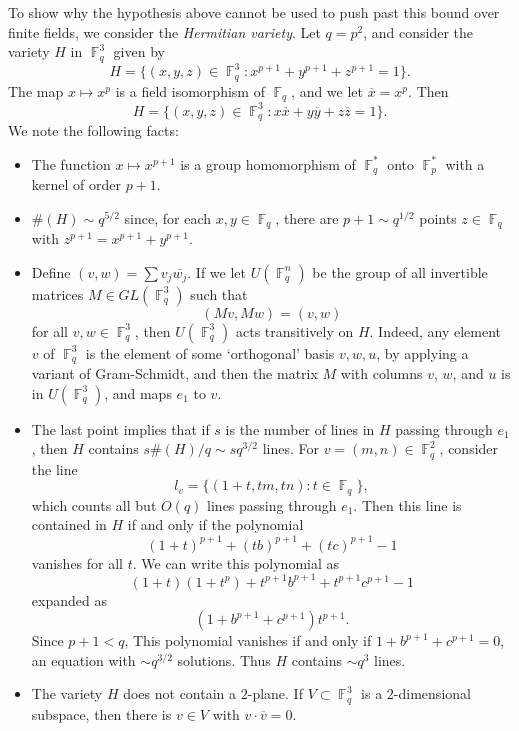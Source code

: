 \documentclass{article}
\DeclareMathOperator{\FF}{\mathbb{F}}
\theoremstyle{plain}
\theoremstyle{definition}
\begin{document}
To show why the hypothesis above cannot be used to push past this bound over finite fields, we consider the \emph{Hermitian variety}. Let $q = p^2$, and consider the variety $H$ in $\FF_q^3$ given by
%
\[ H = \{ (x,y,z) \in \FF_q^3: x^{p+1} + y^{p+1} + z^{p+1} = 1 \}. \]
%
The map $x \mapsto x^p$ is a field isomorphism of $\FF_q$, and we let $\overline{x} = x^p$. Then
%
\[ H = \{ (x,y,z) \in \FF_q^3: x \overline{x} + y \overline{y} + z \overline{z} = 1 \}. \]
%
We note the following facts:
%
\begin{itemize}
    \item The function $x \mapsto x^{p+1}$ is a group homomorphism of $\FF_q^*$ onto $\FF_p^*$ with a kernel of order $p + 1$.

    \item $\#(H) \sim q^{5/2}$ since, for each $x, y \in \FF_q$, there are $p + 1 \sim q^{1/2}$ points $z \in \FF_q$ with $z^{p+1} = x^{p+1} + y^{p+1}$.

    \item Define $(v,w) = \sum v_j \overline{w_j}$. If we let $U(\FF_q^n)$ be the group of all invertible matrices $M \in GL(\FF_q^3)$ such that
    \[ (Mv,Mw) = (v,w) \]
    for all $v,w \in \FF_q^3$, then $U(\FF_q^3)$ acts transitively on $H$. Indeed, any element $v$ of $\FF_q^3$ is the element of some `orthogonal' basis $v,w,u$, by applying a variant of Gram-Schmidt, and then the matrix $M$ with columns $v$, $w$, and $u$ is in $U(\FF_q^3)$, and maps $e_1$ to $v$.

    \item The last point implies that if $s$ is the number of lines in $H$ passing through $e_1$, then $H$ contains $s \#(H) / q \sim s q^{3/2}$ lines. For $v = (m,n) \in \FF_q^2$, consider the line
    \[ l_v = \{ ( 1 + t, tm, tn ) : t \in \FF_q \}, \]
    which counts all but $O(q)$ lines passing through $e_1$. Then this line is contained in $H$ if and only if the polynomial
    \[ (1 + t)^{p+1} + (tb)^{p+1} + (tc)^{p+1} - 1 \]
    vanishes for all $t$. We can write this polynomial as
    \[ (1 + t) ( 1 + t^p ) + t^{p+1} b^{p+1} + t^{p+1} c^{p+1} - 1 \]
    expanded as
    \[ (1 + b^{p+1} + c^{p+1}) t^{p+1}. \]
    Since $p+1 < q$, This polynomial vanishes if and only if $1 + b^{p+1} + c^{p+1} = 0$, an equation with $\sim q^{3/2}$ solutions. Thus $H$ contains $\sim q^3$ lines.

    \item The variety $H$ does not contain a $2$-plane. If $V \subset \FF_q^3$ is a $2$-dimensional subspace, then there is $v \in V$ with $v \cdot \overline{v} = 0$.


\end{itemize}
\end{document}
